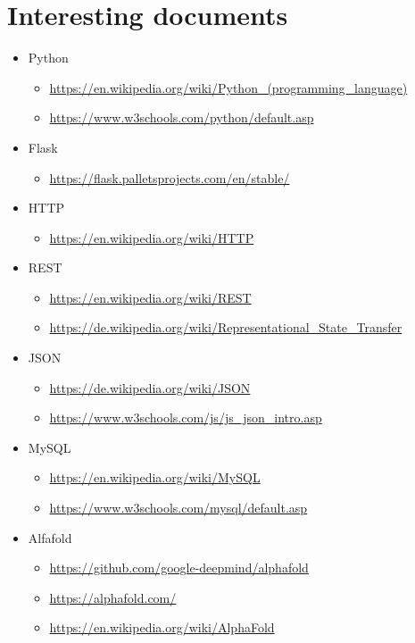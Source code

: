 \documentclass{article}
\begin{document}
\section{Interesting documents}
\begin{itemize}
\item Python
  \begin{itemize}
  \item \url{https://en.wikipedia.org/wiki/Python_(programming_language)}
  \item \url{https://www.w3schools.com/python/default.asp}
  \end{itemize}
\item Flask
  \begin{itemize}
  \item \url{https://flask.palletsprojects.com/en/stable/}
  \end{itemize}
\item HTTP
  \begin{itemize}
  \item \url{https://en.wikipedia.org/wiki/HTTP}
  \end{itemize}
\item REST
  \begin{itemize}
  \item \url{https://en.wikipedia.org/wiki/REST}
  \item \url{https://de.wikipedia.org/wiki/Representational_State_Transfer}
  \end{itemize}
\item JSON
  \begin{itemize}
  \item \url{https://de.wikipedia.org/wiki/JSON}
  \item \url{https://www.w3schools.com/js/js_json_intro.asp}
  \end{itemize}
\item MySQL
  \begin{itemize}
  \item \url{https://en.wikipedia.org/wiki/MySQL}
  \item \url{https://www.w3schools.com/mysql/default.asp}
  \end{itemize}
\item Alfafold
  \begin{itemize}
  \item \url{https://github.com/google-deepmind/alphafold}
  \item \url{https://alphafold.com/}
  \item \url{https://en.wikipedia.org/wiki/AlphaFold}
  \end{itemize}
\end{itemize}
\end{document}
